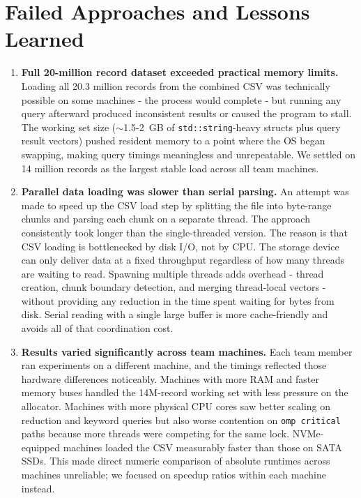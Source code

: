 \documentclass[12pt]{article}
\begin{document}
\section{Failed Approaches and Lessons Learned}

\begin{enumerate}

  \item \textbf{Full 20-million record dataset exceeded practical memory limits.}
    Loading all 20.3 million records from the combined CSV was technically
    possible on some machines - the process would complete - but running
    any query afterward produced inconsistent results or caused the program to
    stall. The working set size ($\sim$1.5-2~GB of \texttt{std::string}-heavy
    structs plus query result vectors) pushed resident memory to a point where
    the OS began swapping, making query timings meaningless and unrepeatable.
    We settled on 14 million records as the largest stable load across all
    team machines.

  \item \textbf{Parallel data loading was slower than serial parsing.}
    An attempt was made to speed up the CSV load step by splitting the file
    into byte-range chunks and parsing each chunk on a separate thread.
    The approach consistently took longer than the single-threaded version.
    The reason is that CSV loading is bottlenecked by disk I/O, not by CPU.
    The storage device can only deliver data at a fixed throughput regardless
    of how many threads are waiting to read. Spawning multiple threads adds
    overhead - thread creation, chunk boundary detection, and merging
    thread-local vectors - without providing any reduction in the time
    spent waiting for bytes from disk. Serial reading with a single large
    buffer is more cache-friendly and avoids all of that coordination cost.

  \item \textbf{Results varied significantly across team machines.}
    Each team member ran experiments on a different machine, and the timings
    reflected those hardware differences noticeably. Machines with more RAM
    and faster memory buses handled the 14M-record working set with less
    pressure on the allocator. Machines with more physical CPU cores saw
    better scaling on reduction and keyword queries but also worse contention
    on \texttt{omp critical} paths because more threads were competing for the
    same lock. NVMe-equipped machines loaded the CSV measurably faster than
    those on SATA SSDs. This made direct numeric comparison of absolute
    runtimes across machines unreliable; we focused on speedup ratios within
    each machine instead.


\end{enumerate}
\end{document}
